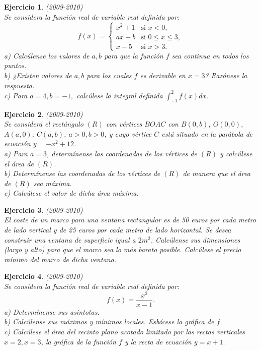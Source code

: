 \documentclass[12pt, a4paper]{amsart}
\newtheorem{ejer}{Ejercicio}
\begin{document}
\begin{ejer}\em (2009-2010)\\%
Se considera la función real de variable real definida por:
\begin{equation*}
f(x)=\left \{ \begin{matrix} x^2+1 & \mbox{si } x<0,
\\ ax+b & \mbox{si } 0\leq x\leq 3,
\\ x-5 & \mbox{si } x>3. \end{matrix}\right. 
\end{equation*}
a) Calcúlense los valores de $a,b$ para que la función $f$ sea continua en todos los puntos.\\
b) ¿Existen valores de  $a,b$ para los cuales $f$ es derivable en $x=3$? Razónese la respuesta.\\
c) Para $a=4,b=-1,$ calcúlese la integral definida $\int_{-1}^2f(x)dx$.
\end{ejer}

\begin{ejer}\em (2009-2010)\\
Se considera el rectángulo $(R)$ con vértices $BOAC$ con $B(0,b)$, $O(0,0)$, $A(a,0)$, $C(a,b)$, $a>0,b>0$, y cuyo vértice $C$ está situado en la parábola de ecuación $y=-x^2+12$.\\
a) Para $a=3$, determínense las coordenadas de los vértices de $(R)$ y calcúlese el área de $(R)$.\\
b) Determínense las coordenadas de los vértices de $(R)$ de manera que el área de $(R)$ sea máxima.\\
c) Calcúlese el valor de dicha área máxima.
\end{ejer}

\begin{ejer}\em (2009-2010)\\
El coste de un marco para una ventana rectangular es de 50 euros por cada metro de lado vertical y de 25 euros por cada metro de lado horizontal. Se desea construir una ventana de superficie igual a $2m^2$. Calcúlense sus dimensiones (largo y alto) para que el marco sea lo más barato posible. Calcúlese el precio mínimo del marco de dicha ventana.
\end{ejer}

\begin{ejer}\em (2009-2010)\\%
Se considera la función real de variable real definida por: 
$$
f(x)=\frac{x^2}{x-1}.
$$
a) Determínense sus asíntotas.\\
b) Calcúlense sus máximos y mínimos locales. Esbócese la gráfica de $f$.\\
c) Calcúlese el área del recinto plano acotado limitado por las rectas verticales $x=2,x=3$, la gráfica de la función $f$ y la recta de ecuación $y=x+1.$
\end{ejer}
\end{document}
